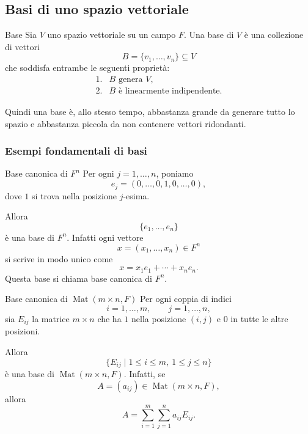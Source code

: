 \documentclass[a4paper]{article}
\begin{document}
\subsection{Basi di uno spazio vettoriale}

\begin{snippetdefinition}{Base}
    Sia \(V\) uno spazio vettoriale su un campo \(F\). Una base di \(V\) è una collezione di vettori
    \[
        B=\{v_1,\ldots,v_n\}\subseteq V
    \]
    che soddisfa entrambe le seguenti proprietà:
    \[
        \begin{array}{ll}
            \text{1.} & B \text{ genera } V,\\
            \text{2.} & B \text{ è linearmente indipendente}.
        \end{array}
    \]
\end{snippetdefinition}

Quindi una base è, allo stesso tempo, abbastanza grande da generare tutto lo spazio e abbastanza piccola da non contenere vettori ridondanti.

\subsubsection{Esempi fondamentali di basi}

\begin{snippetexample}{Base canonica di \(F^n\)}
    Per ogni \(j=1,\ldots,n\), poniamo
    \[
        e_j=(0,\ldots,0,1,0,\ldots,0),
    \]
    dove \(1\) si trova nella posizione \(j\)-esima.

    Allora
    \[
        \{e_1,\ldots,e_n\}
    \]
    è una base di \(F^n\). Infatti ogni vettore
    \[
        x=(x_1,\ldots,x_n)\in F^n
    \]
    si scrive in modo unico come
    \[
        x=x_1e_1+\cdots+x_ne_n.
    \]
    Questa base si chiama base canonica di \(F^n\).
\end{snippetexample}

\begin{snippetexample}{Base canonica di \(\operatorname{Mat}(m\times n,F)\)}
    Per ogni coppia di indici
    \[
        i=1,\ldots,m,
        \qquad
        j=1,\ldots,n,
    \]
    sia \(E_{ij}\) la matrice \(m\times n\) che ha \(1\) nella posizione \((i,j)\) e \(0\) in tutte le altre posizioni.

    Allora
    \[
        \{E_{ij}\mid 1\leq i\leq m,\ 1\leq j\leq n\}
    \]
    è una base di \(\operatorname{Mat}(m\times n,F)\). Infatti, se
    \[
        A=(a_{ij})\in\operatorname{Mat}(m\times n,F),
    \]
    allora
    \[
        A=\sum_{i=1}^{m}\sum_{j=1}^{n}a_{ij}E_{ij}.
    \]
\end{snippetexample}
\end{document}
